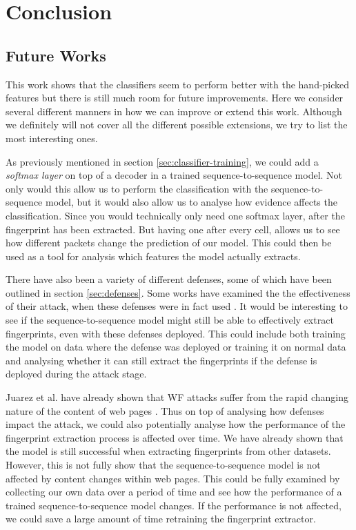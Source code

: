 

\chapter{Conclusion}


\section{Future Works}

This work shows that the classifiers seem to perform better with the hand-picked features but there is still much room for future improvements.
Here we consider several different manners in how we can improve or extend this work.
Although we definitely will not cover all the different possible extensions, we try to list the most interesting ones.

As previously mentioned in section \ref{sec:classifier-training}, we could add a \textit{softmax layer} on top of a decoder in a trained sequence-to-sequence model.
Not only would this allow us to perform the classification with the sequence-to-sequence model, but it would also allow us to analyse how evidence affects the classification.
Since you would technically only need one softmax layer, after the fingerprint has been extracted.
But having one after every cell, allows us to see how different packets change the prediction of our model.
This could then be used as a tool for analysis which features the model actually extracts.

There have also been a variety of different defenses, some of which have been outlined in section \ref{sec:defenses}.
Some works have examined the the effectiveness of their attack, when these defenses were in fact used \cite{kfingerprinting,wang_cai_johnson_nithyanand_goldberg_2014}.
It would be interesting to see if the sequence-to-sequence model might still be able to effectively extract fingerprints, even with these defenses deployed.
This could include both training the model on data where the defense was deployed or training it on normal data and analysing whether it can still extract the fingerprints if the defense is deployed during the attack stage.

Juarez et al. have already shown that WF attacks suffer from the rapid changing nature of the content of web pages \cite{wfpevaluation}.
Thus on top of analysing how defenses impact the attack, we could also potentially analyse how the performance of the fingerprint extraction process is affected over time.
We have already shown that the model is still successful when extracting fingerprints from other datasets. %
However, this is not fully show that the sequence-to-sequence model is not affected by content changes within web pages.
This could be fully examined by collecting our own data over a period of time and see how the performance of a trained sequence-to-sequence model changes.
If the performance is not affected, we could save a large amount of time retraining the fingerprint extractor.

